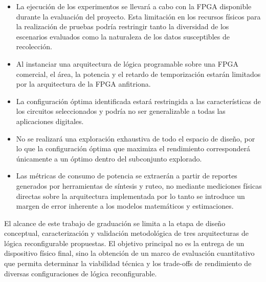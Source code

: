 \begin{itemize}

    \item La ejecución de los experimentos se llevará a cabo con la FPGA 
    disponible durante la evaluación del proyecto. Esta limitación en los recursos 
    físicos para la realización de pruebas podría restringir tanto la diversidad de 
    los escenarios evaluados como la naturaleza de los datos susceptibles de recolección.

    \item Al instanciar una arquitectura de lógica programable sobre una FPGA comercial, 
    el área, la potencia y el retardo de temporización estarán limitados por la arquitectura 
    de la FPGA anfitriona.

    \item La configuración óptima identificada estará restringida a las características 
    de los circuitos seleccionados y podría no ser generalizable a todas las aplicaciones 
    digitales.

    \item No se realizará una exploración exhaustiva de todo el espacio de diseño, por lo 
    que la configuración óptima que maximiza el rendimiento corresponderá únicamente a un 
    óptimo dentro del subconjunto explorado.

    \item Las métricas de consumo de potencia se extraerán a partir de reportes generados 
    por herramientas de síntesis y ruteo, no mediante mediciones físicas directas sobre 
    la arquitectura implementada por lo tanto se introduce un margen de error inherente a 
    los modelos matemáticos y estimaciones.



\end{itemize}

El alcance de este trabajo de graduación se limita a la etapa de diseño conceptual, 
caracterización y validación metodológica de tres arquitecturas de lógica reconfigurable 
propuestas. El objetivo principal no es la entrega de un dispositivo físico final, sino 
la obtención de un marco de evaluación cuantitativo que permita determinar la viabilidad 
técnica y los trade-offs de rendimiento de diversas configuraciones de lógica reconfigurable.

